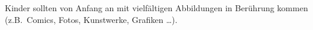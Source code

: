 Kinder sollten von Anfang an mit vielfältigen Abbildungen in Berührung kommen (z.B.\ Comics, Fotos, Kunstwerke, Grafiken \ldots).